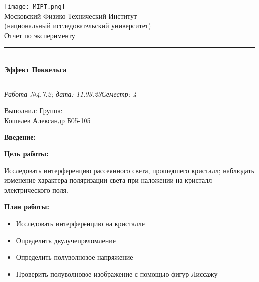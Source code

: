 \documentclass{beamer}
\begin{document}
	\selectfont
	\begin{frame}
		\vspace*{\fill}
		
		\begin{center}
			\texttt{[image: MIPT.png]}
			\\[0.2cm] Московский Физико-Технический Институт\\(национальный исследовательский университет)
			\\[0.5cm]{\Large Отчет по эксперименту}
			\\[0.2cm]\noindent\rule{\textwidth}{1pt}
			\\\textbf{Эффект Поккельса}
			\\[-0.2cm]\noindent\rule{\textwidth}{1pt}
		\end{center}
		
		\begin{flushleft}
			\textit{Работа №4.7.2; дата: 11.03.23}\hfill\textit{Семестр: 4}
		\end{flushleft}
		
		\vspace*{\fill}
		
		\begin{flushleft}
			Выполнил: \hspace{\fill} Группа:
			\\Кошелев Александр \hspace{\fill} Б05-105
		\end{flushleft}
	\end{frame}

	\begin{frame}
		{\large \textbf{Введение:}}
		
		\textbf{Цель работы:}
		
			Исследовать интерференцию рассеянного света, прошедшего кристалл; наблюдать изменение характера поляризации света при наложении на кристалл электрического поля.
		
		\textbf{План работы:}
		
		\begin{itemize}
			\item Исследовать интерференцию на кристалле
			\item Определить двулучепреломление
			\item Определить полуволновое напряжение
			\item Проверить полуволновое изображение с помощью фигур Лиссажу
		\end{itemize}
	\end{frame}
\end{document}
